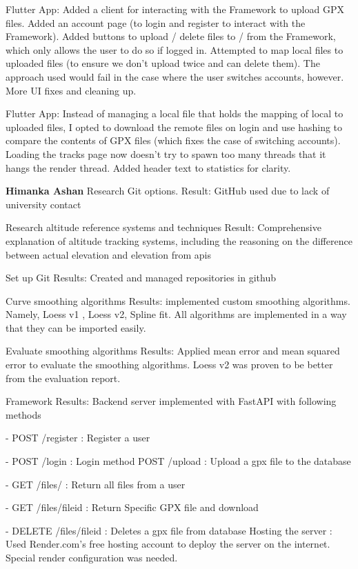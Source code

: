 \documentclass[12pt]{article}
\begin{document}
Flutter App: Added a client for interacting with the Framework to upload GPX files. Added an account page (to login and register to interact with the Framework). Added buttons to upload / delete files to / from the Framework, which only allows the user to do so if logged in. Attempted to map local files to uploaded files (to ensure we don't upload twice and can delete them). The approach used would fail in the case where the user switches accounts, however. More UI fixes and cleaning up.

Flutter App: Instead of managing a local file that holds the mapping of local to uploaded files, I opted to download the remote files on login and use hashing to compare the contents of GPX files (which fixes the case of switching accounts). Loading the tracks page now doesn't try to spawn too many threads that it hangs the render thread. Added header text to statistics for clarity.

{\large\textbf{Himanka Ashan}}
Research Git options. 
Result: GitHub used due to lack of university contact 

Research altitude reference systems and techniques 
Result: Comprehensive explanation of altitude tracking systems, including the reasoning on the difference between actual elevation and elevation from apis 

Set up Git 
Results: Created and managed repositories in github 

Curve smoothing algorithms 
Results: implemented custom smoothing algorithms. Namely, Loess v1 , Loess v2, Spline fit.  All algorithms are implemented in a way that they can be imported easily. 

Evaluate smoothing algorithms 
Results: Applied mean error and mean squared error to evaluate the smoothing algorithms. Loess v2 was proven to be better from the evaluation report. 

Framework 
Results: Backend server implemented with FastAPI with following methods 

- POST /register : Register a user 

- POST /login : Login method  POST /upload : Upload a gpx file to the database 

- GET /files/ : Return all files from a user 

- GET /files/fileid : Return Specific GPX file and download 

- DELETE /files/fileid : Deletes a gpx file from database 
Hosting the server : Used Render.com’s free hosting account to deploy the server on the internet. Special render configuration was needed. 
\end{document}
